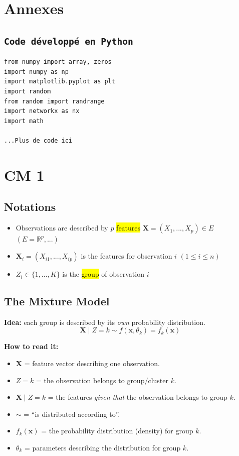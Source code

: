 \documentclass[a4paper,11pt]{article}
\begin{document}
\section{Annexes}
\subsection{\texttt{Code développé en Python}}
\begin{verbatim}
from numpy import array, zeros
import numpy as np
import matplotlib.pyplot as plt
import random
from random import randrange
import networkx as nx
import math

...Plus de code ici
\end{verbatim}
\fi

\section{CM 1}

\subsection{Notations}
\begin{itemize}
	\item Observations are described by $p$ \hl{features} $\bm{X}=(X_{1},...,X_{p})\in\mathit{E}$ $ (E=\mathbb{R}^{p},...)$
	\item $\bm{X}_{i}=(X_{i1},...,X_{ip})$ is the features for observation $i$ $(1 \leq i \leq n)$
	\item $\mathit{Z}_i\in\{1,...,\mathit{K}\}$ is the \hl{group} of observation $i$
\end{itemize}

\subsection{The Mixture Model}
\textbf{Idea:} each group is described by its \textit{own} probability distribution.
\[
\bm{X} \mid \mathit{Z} = k \sim f(\mathbf{x},\theta_{k})=f_k(\mathbf{x})
\]

\textbf{How to read it:}
\begin{itemize}
\item $\bm{X}$ = feature vector describing one observation.
\item $Z=k$ = the observation belongs to group/cluster $k$.
\item $\bm{X}\mid Z=k$ = the features \emph{given that} the observation belongs to group $k$.
\item $\sim$ = ``is distributed according to''.
\item $f_k(\mathbf{x})$ = the probability distribution (density) for group $k$.
\item $\theta_k$ = parameters describing the distribution for group $k$.
\end{itemize}
\end{document}
